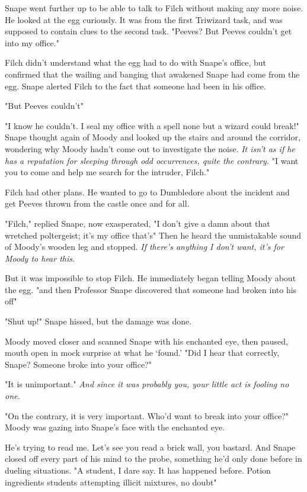 Snape went further up to be able to talk to Filch without making any more noise. He looked at the egg curiously. It was from the first Triwizard task, and was supposed to contain clues to the second task. "Peeves? But Peeves couldn't get into my office."

Filch didn't understand what the egg had to do with Snape's office, but confirmed that the wailing and banging that awakened Snape had come from the egg. Snape alerted Filch to the fact that someone had been in his office.

"But Peeves couldn't{\el}"

"I know he couldn't. I seal my office with a spell none but a wizard could break!" Snape thought again of Moody and looked up the stairs and around the corridor, wondering why Moody hadn't come out to investigate the noise. \emph{It isn't as if he has a reputation for sleeping through odd occurrences, quite the contrary.} "I want you to come and help me search for the intruder, Filch."

Filch had other plans. He wanted to go to Dumbledore about the incident and get Peeves thrown from the castle once and for all.

"Filch," replied Snape, now exasperated, "I don't give a damn about that wretched poltergeist; it's my office that's{\el}" Then he heard the unmistakable sound of Moody's wooden leg and stopped. \emph{If there's anything I don't want, it's for Moody to hear this.}

But it was impossible to stop Filch. He immediately began telling Moody about the egg. "{\el}and then Professor Snape discovered that someone had broken into his off{\el}"

"Shut up!" Snape hissed, but the damage was done.

Moody moved closer and scanned Snape with his enchanted eye, then paused, mouth open in mock surprise at what he `found.' "Did I hear that correctly, Snape? Someone broke into your office?"

"It is unimportant." \emph{And since it was probably you, your little act is fooling no one.}

"On the contrary, it is very important. Who'd want to break into your office?" Moody was gazing into Snape's face with the enchanted eye.

He's trying to read me. Let's see you read a brick wall, you bastard. And Snape closed off every part of his mind to the probe, something he'd only done before in dueling situations. "A student, I dare say. It has happened before. Potion ingredients{\el} students attempting illicit mixtures, no doubt{\el}"

